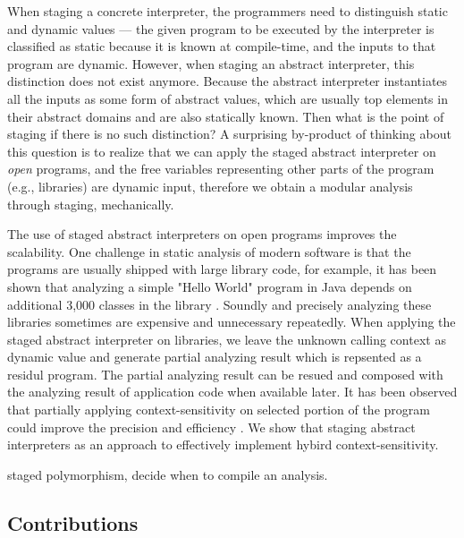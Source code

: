 When staging a concrete interpreter, the programmers need to distinguish 
static and dynamic values --- the given program to be executed by the 
interpreter is classified as static because it is known at compile-time, 
and the inputs to that program are dynamic.  However, when staging an 
abstract interpreter, this distinction does not exist anymore. Because the 
abstract interpreter instantiates all the inputs as some form of abstract 
values, which are usually top elements in their abstract domains and are 
also statically known. 
Then what is the point of staging if there is no such distinction?
A surprising by-product of thinking about this question is to realize that 
we can apply the staged abstract interpreter on \textit{open} programs, and
the free variables representing other parts of the program (e.g., libraries) 
are dynamic input, therefore we obtain a modular analysis through staging, 
mechanically. 

The use of staged abstract interpreters on open programs improves the scalability. 
One challenge in static analysis of modern software is that the programs are usually 
shipped with large library code, for example, it has been shown that analyzing a simple
"Hello World" program in Java depends on additional 3,000 classes in the library \cite{DBLP:conf/oopsla/KulkarniMZN16}.
Soundly and precisely analyzing these libraries sometimes are expensive and unnecessary repeatedly.
When applying the staged abstract interpreter on libraries, we leave the unknown 
calling context as dynamic value and generate partial analyzing result which is 
repsented as a residul program. The partial analyzing result can be resued and composed
with the analyzing result of application code when available later. 
It has been observed that partially applying context-sensitivity on selected portion of the program could
improve the precision and efficiency \cite{zipper2018, Kastrinis:2013:HCP:2491956.2462191}. 
We show that staging abstract interpreters as an approach to effectively implement hybird context-sensitivity\todo{}.

staged polymorphism, decide when to compile an analysis.  

\subsection{Contributions}

